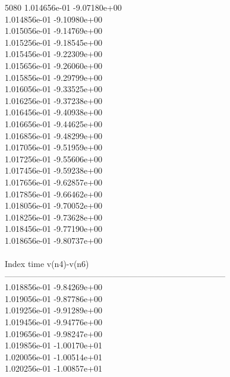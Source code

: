 5080	1.014656e-01	-9.07180e+00	\\ 	1.014856e-01	-9.10980e+00	\\ 	1.015056e-01	-9.14769e+00	\\ 	1.015256e-01	-9.18545e+00	\\ 	1.015456e-01	-9.22309e+00	\\ 	1.015656e-01	-9.26060e+00	\\ 	1.015856e-01	-9.29799e+00	\\ 	1.016056e-01	-9.33525e+00	\\ 	1.016256e-01	-9.37238e+00	\\ 	1.016456e-01	-9.40938e+00	\\ 	1.016656e-01	-9.44625e+00	\\ 	1.016856e-01	-9.48299e+00	\\ 	1.017056e-01	-9.51959e+00	\\ 	1.017256e-01	-9.55606e+00	\\ 	1.017456e-01	-9.59238e+00	\\ 	1.017656e-01	-9.62857e+00	\\ 	1.017856e-01	-9.66462e+00	\\ 	1.018056e-01	-9.70052e+00	\\ 	1.018256e-01	-9.73628e+00	\\ 	1.018456e-01	-9.77190e+00	\\ 	1.018656e-01	-9.80737e+00	\\ \hline
\\ \hline
Index   time            v(n4)-v(n6)     \\ \hline
--------------------------------------------------------------------------------\\ 	1.018856e-01	-9.84269e+00	\\ 	1.019056e-01	-9.87786e+00	\\ 	1.019256e-01	-9.91289e+00	\\ 	1.019456e-01	-9.94776e+00	\\ 	1.019656e-01	-9.98247e+00	\\ 	1.019856e-01	-1.00170e+01	\\ 	1.020056e-01	-1.00514e+01	\\ 	1.020256e-01	-1.00857e+01	\\ \hline
